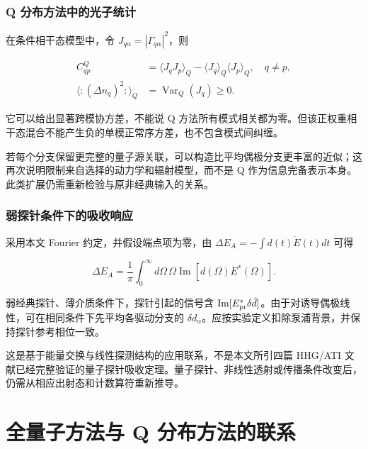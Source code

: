 \documentclass[UTF8,a4paper,zihao=-4,openany,fontset=fandol]{ctexbook}
\begin{document}
\section{Q 分布方法中的光子统计}\label{sec:13:11}


在条件相干态模型中，令 $J_{q\alpha}=|\Gamma_{q\alpha}|^2$，则



\begin{equation*}
\begin{aligned}
C_{qp}^{Q}&=\langle J_qJ_p\rangle_Q
-\langle J_q\rangle_Q\langle J_p\rangle_Q,\quad q\ne p,\\
\langle:(\Delta n_q)^2:\rangle_Q&=\operatorname{Var}_Q(J_q)\ge0.
\end{aligned}
\tag{13.8}\label{eq:13.8}
\end{equation*}


它可以给出显著跨模协方差，不能说 Q 方法所有模式相关都为零。但该正权重相干态混合不能产生负的单模正常序方差，也不包含模式间纠缠。



若每个分支保留更完整的量子源关联，可以构造比平均偶极分支更丰富的近似；这再次说明限制来自选择的动力学和辐射模型，而不是 Q 作为信息完备表示本身。此类扩展仍需重新检验与原非经典输入的关系。



\section{弱探针条件下的吸收响应}\label{sec:13:12}


采用本文 Fourier 约定，并假设端点项为零，由 $\Delta E_A=-\int d(t)\dot E(t)dt$ 可得



\begin{equation*}
\Delta E_A=\frac1\pi\int_0^\infty d\Omega\,
\Omega\operatorname{Im}[d(\Omega)E^*(\Omega)].
\tag{13.9}\label{eq:13.9}
\end{equation*}


弱经典探针、薄介质条件下，探针引起的信号含 $\operatorname{Im}[E_{\rm pr}^*\delta\bar d]$。由于对诱导偶极线性，可在相同条件下先平均各驱动分支的 $\delta d_\alpha$。应按实验定义扣除泵浦背景，并保持探针参考相位一致。



这是基于能量交换与线性探测结构的应用联系，不是本文所引四篇 HHG/ATI 文献已经完整验证的量子探针吸收定理。量子探针、非线性透射或传播条件改变后，仍需从相应出射态和计数算符重新推导。


\part{全量子方法与 Q 分布方法的联系}
\end{document}
